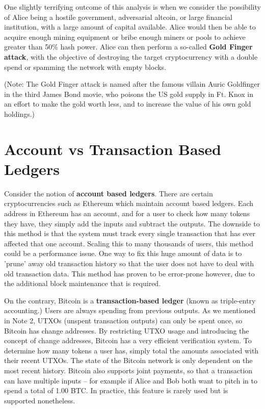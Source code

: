 \documentclass[11pt]{article}
\begin{document}
    One slightly terrifying outcome of this analysis is when we consider the possibility of Alice being a hostile government, adversarial altcoin, or large financial institution, with a large amount of capital available. Alice would then be able to acquire enough mining equipment or bribe enough miners or pools to achieve greater than 50\% hash power. Alice can then perform a so-called \textbf{Gold Finger attack}, with the objective of destroying the target cryptocurrency with a double spend or spamming the network with empty blocks.
    
    (Note: The Gold Finger attack is named after the famous villain Auric Goldfinger in the third James Bond movie, who poisons the US gold supply in Ft. Knox in an effort to make the gold worth less, and to increase the value of his own gold holdings.)
    
    \section*{Account vs Transaction Based Ledgers}
    
    Consider the notion of \textbf{account based ledgers}. There are certain cryptocurrencies such as Ethereum which maintain account based ledgers. Each address in Ethereum has an account, and for a user to check how many tokens they have, they simply add the inputs and subtract the outputs. The downside to this method is that the system must track every single transaction that has ever affected that one account. Scaling this to many thousands of users, this method could be a performance issue. One way to fix this huge amount of data is to 'prune' away old transaction history so that the user does not have to deal with old transaction data. This method has proven to be error-prone however, due to the additional block maintenance that is required. 
    
    On the contrary, Bitcoin is a \textbf{transaction-based ledger} (known as triple-entry accounting.) Users are always spending from previous outputs. As we mentioned in Note 2, UTXOs (unspent transaction outputs) can only be spent once, so Bitcoin has change addresses. By restricting UTXO usage and introducing the concept of change addresses, Bitcoin has a very efficient verification system. To determine how many tokens a user has, simply total the amounts associated with their recent UTXOs. The state of the Bitcoin network is only dependent on the most recent history. Bitcoin also supports joint payments, so that a transaction can have multiple inputs -- for example if Alice and Bob both want to pitch in to spend a total of 1.00 BTC. In practice, this feature is rarely used but is supported nonetheless.
    
\end{document}
